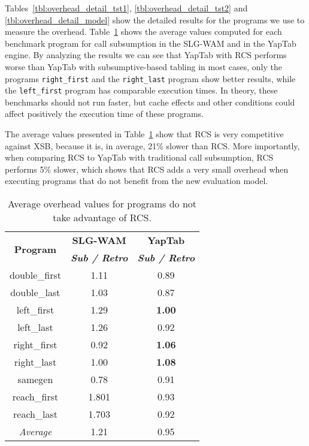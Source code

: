 Tables~\ref{tbl:overhead_detail_tst1}, \ref{tbl:overhead_detail_tst2} and \ref{tbl:overhead_detail_model}
show the detailed results for the programs we use to measure the overhead.
Table~\ref{tbl:overhead_overview} shows the average values computed for each benchmark program
for call subsumption in the SLG-WAM and in the YapTab engine.
By analyzing the results we can see that YapTab with RCS performs worse
than YapTab with subsumptive-based tabling in most cases, only the
programs \texttt{right\_first} and the \texttt{right\_last} program show better results,
while the \texttt{left\_first} program has comparable execution times.
In theory, these benchmarks should not run faster, but cache effects and other
conditions could affect positively the execution time of these programs.

The average values presented in Table~\ref{tbl:overhead_overview} show that
RCS is very competitive against XSB, because it is, in average, 21\% slower than RCS. More
importantly, when comparing RCS to YapTab with traditional call subsumption, RCS performs 5\% slower,
which shows that RCS adds a very small overhead when executing programs that do not benefit from the
new evaluation model.

\begin{table}[ht]
\centering
  \begin{tabular}{ccc}
   \hline
    \hline
    \multirow{2}{*}{\textbf{Program}} & \textbf{SLG-WAM} & \textbf{YapTab} \\
    & \textbf{\textit{\small{Sub / Retro}}} & \textbf{\textit{\small{Sub / Retro}}} \\
   \hline
   \hline
double\_first & 1.11 & 0.89 \\
double\_last & 1.03 & 0.87 \\
left\_first & 1.29 & \textbf{1.00} \\
left\_last &  1.26  & 0.92 \\
right\_first & 0.92 & \textbf{1.06} \\
right\_last & 1.00 & \textbf{1.08} \\
samegen & 0.78 & 0.91 \\
reach\_first  &  1.801  & 0.93 \\
reach\_last  &  1.703  & 0.92 \\
\hline
\hline
\textit{Average} &  1.21 &  0.95 \\
\hline
\hline
\end{tabular}
\caption{Average overhead values for programs do not take advantage of RCS.}
\label{tbl:overhead_overview}
\end{table}

